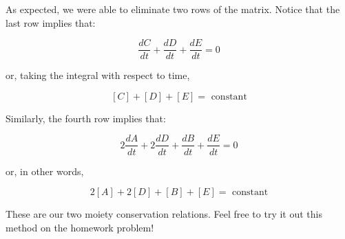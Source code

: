 \documentclass{article}
\begin{document}
As expected, we were able to eliminate two rows of the matrix. Notice that the last row implies that:

\[ \frac{dC}{dt} + \frac{dD}{dt} + \frac{dE}{dt} = 0 \]

or, taking the integral with respect to time,

\[ \left[ C \right] + \left[ D \right] + \left[ E \right] = \textrm{ constant} \]

Similarly, the fourth row implies that:

\[ 2 \frac{dA}{dt} + 2 \frac{dD}{dt} + \frac{dB}{dt} + \frac{dE}{dt} = 0 \]

or, in other words,

\[ 2 \left[ A \right] + 2 \left[ D \right]+ \left[ B \right]  + \left[ E \right] = \textrm{ constant} \]

These are our two moiety conservation relations. Feel free to try it out this method on the homework problem!\\
\end{document}
